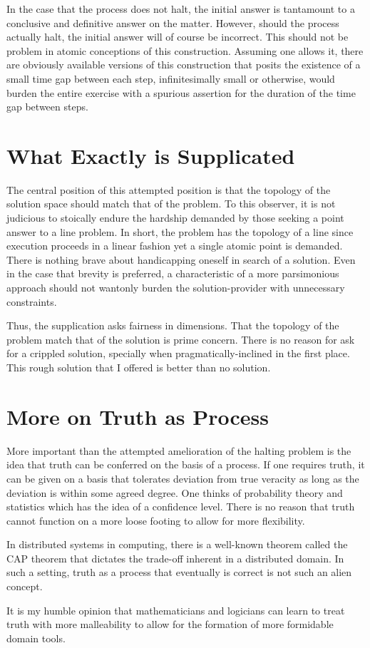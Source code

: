 \documentclass{article}
\begin{document}
	In the case that the process does not halt, the initial answer is tantamount to a conclusive and definitive answer on the matter. However, should the process actually halt, the initial answer will of course be incorrect. This should not be problem in atomic conceptions of this construction. Assuming one allows it, there are obviously available versions of this construction that posits the existence of a small time gap between each step, infinitesimally small or otherwise, would burden the entire exercise with a spurious assertion for the duration of the time gap between steps.
	
	\section{What Exactly is Supplicated}
	
	The central position of this attempted position is that the topology of the solution space should match that of the problem. To this observer, it is not judicious to stoically endure the hardship demanded by those seeking a point answer to a line problem. In short, the problem has the topology of a line since execution proceeds in a linear fashion yet a single atomic point is demanded. There is nothing brave about handicapping oneself in search of a solution. Even in the case that brevity is preferred, a characteristic of a more parsimonious approach should not wantonly burden the solution-provider with unnecessary constraints.
	
	Thus, the supplication asks fairness in dimensions. That the topology of the problem match that of the solution is prime concern. There is no reason for ask for a crippled solution, specially when pragmatically-inclined in the first place. This rough solution that I offered is better than no solution.
	
	\section{More on Truth as Process}
	More important than the attempted amelioration of the halting problem is the idea that truth can be conferred on the basis of a process. If one requires truth, it can be given on a basis that tolerates deviation from true veracity as long as the deviation is within some agreed degree. One thinks of probability theory and statistics which has the idea of a confidence level. There is no reason that truth cannot function on a more loose footing to allow for more flexibility.
	
	In distributed systems in computing, there is a well-known theorem called the CAP theorem that dictates the trade-off inherent in a distributed domain. In such a setting, truth as a process that eventually is correct is not such an alien concept.
	
	It is my humble opinion that mathematicians and logicians can learn to treat truth with more malleability to allow for the formation of more formidable domain tools.
\end{document}
